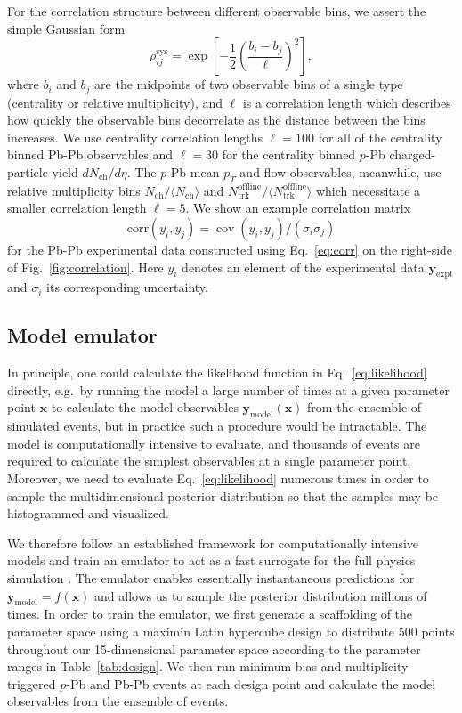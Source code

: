 \documentclass[aps,prc,reprint,amsmath,nofootinbib]{revtex4-1}
\newcommand{\nch}{N_\text{ch}}
\newcommand{\ntrk}{N_\text{trk}^\text{offline}}
\newcommand{\xv}{\mathbf x}
\newcommand{\ym}{{\mathbf y}_\text{model}}
\newcommand{\ye}{{\mathbf y}_\text{expt}}
\DeclareMathOperator{\cov}{cov}
\begin{document}
For the correlation structure between different observable bins, we assert the simple Gaussian form
\begin{equation}
  \label{eq:corr}
  \rho_{ij}^\text{sys} = \exp \left[ -\frac{1}{2} \left(\frac{b_i - b_j}{\ell} \right)^2 \right],
\end{equation}
where $b_i$ and $b_j$ are the midpoints of two observable bins of a single type (centrality or relative multiplicity), and $\ell$ is a correlation length which describes how quickly the observable bins decorrelate as the distance between the bins increases.
We use centrality correlation lengths ${\ell=100}$ for all of the centrality binned Pb-Pb observables and $\ell=30$ for the centrality binned $p$-Pb charged-particle yield $d\nch/d\eta$.
The \mbox{$p$-Pb} mean $p_T$ and flow observables, meanwhile, use relative multiplicity bins $\nch / \langle \nch \rangle$ and $\ntrk / \langle \ntrk \rangle$ which necessitate a smaller correlation length $\ell=5$.
We show an example correlation matrix
\begin{equation}
  \mathrm{corr}(y_i, y_j) = \cov(y_i, y_j)/(\sigma_i \sigma_j)
\end{equation}
for the Pb-Pb experimental data constructed using Eq.~\eqref{eq:corr} on the right-side of Fig.~\ref{fig:correlation}.
Here $y_i$ denotes an element of the experimental data $\ye$ and $\sigma_i$ its corresponding uncertainty.

\subsection{Model emulator}

In principle, one could calculate the likelihood function in Eq.~\eqref{eq:likelihood} directly, e.g.\ by running the model a large number of times at a given parameter point $\xv$ to calculate the model observables $\ym(\xv)$ from the ensemble of simulated events, but in practice such a procedure would be intractable.
The model is computationally intensive to evaluate, and thousands of events are required to calculate the simplest observables at a single parameter point.
Moreover, we need to evaluate Eq.~\eqref{eq:likelihood} numerous times in order to sample the multidimensional posterior distribution so that the samples may be histogrammed and visualized.

We therefore follow an established framework for computationally intensive models and train an emulator to act as a fast surrogate for the full physics simulation \cite{OHagan:2006ba, Higdon:2008cmc, Higdon:2014tva}.
The emulator enables essentially instantaneous predictions for $\ym = f(\xv)$ and allows us to sample the posterior distribution millions of times.
In order to train the emulator, we first generate a scaffolding of the parameter space using a maximin Latin hypercube design \cite{Morris:1995lh} to distribute 500 points throughout our 15-dimensional parameter space according to the parameter ranges in Table~\ref{tab:design}.
We then run minimum-bias and multiplicity triggered $p$-Pb and Pb-Pb events at each design point and calculate the model observables from the ensemble of events.
\end{document}
